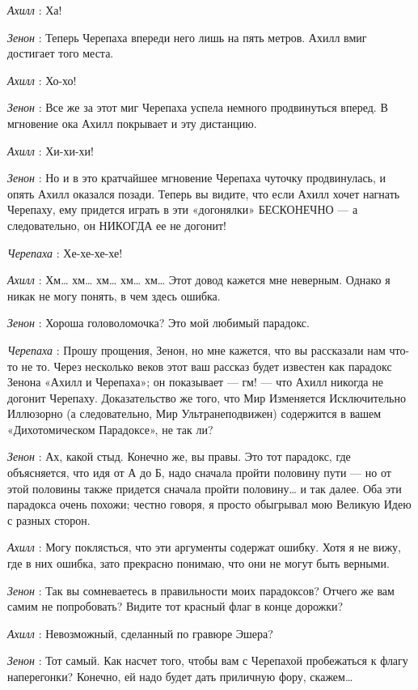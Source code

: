 \emph{Ахилл} : Ха!

\emph{Зенон} : Теперь Черепаха впереди него лишь на пять метров. Ахилл вмиг достигает того места.

\emph{Ахилл} : Хо-хо!

\emph{Зенон} : Все же за этот миг Черепаха успела немного продвинуться вперед. В мгновение ока Ахилл покрывает и эту дистанцию.

\emph{Ахилл} : Хи-хи-хи!

\emph{Зенон} : Но и в это кратчайшее мгновение Черепаха чуточку продвинулась, и опять Ахилл оказался позади. Теперь вы видите, что если Ахилл хочет нагнать Черепаху, ему придется играть в эти «догонялки» БЕСКОНЕЧНО --- а следовательно, он НИКОГДА ее не догонит!

\emph{Черепаха} : Хе-хе-хе-хе!

\emph{Ахилл} : Хм\ldots{} хм\ldots{} хм\ldots{} хм\ldots{} хм\ldots{} Этот довод кажется мне неверным. Однако я никак не могу понять, в чем здесь ошибка.

\emph{Зенон} : Хороша головоломочка? Это мой любимый парадокс.

\emph{Черепаха} : Прошу прощения, Зенон, но мне кажется, что вы рассказали нам что-то не то. Через несколько веков этот ваш рассказ будет известен как парадокс Зенона «Ахилл и Черепаха»; он показывает --- гм! --- что Ахилл никогда не догонит Черепаху. Доказательство же того, что Мир Изменяется Исключительно Иллюзорно (а следовательно, Мир Ультранеподвижен) содержится в вашем «Дихотомическом Парадоксе», не так ли?

\emph{Зенон} : Ах, какой стыд. Конечно же, вы правы. Это тот парадокс, где объясняется, что идя от А до Б, надо сначала пройти половину пути --- но от этой половины также придется сначала пройти половину\ldots{} и так далее. Оба эти парадокса очень похожи; честно говоря, я просто обыгрывал мою Великую Идею с разных сторон.

\emph{Ахилл} : Могу поклясться, что эти аргументы содержат ошибку. Хотя я не вижу, где в них ошибка, зато прекрасно понимаю, что они не могут быть верными.

\emph{Зенон} : Так вы сомневаетесь в правильности моих парадоксов? Отчего же вам самим не попробовать? Видите тот красный флаг в конце дорожки?

\emph{Ахилл} : Невозможный, сделанный по гравюре Эшера?

\emph{Зенон} : Тот самый. Как насчет того, чтобы вам с Черепахой пробежаться к флагу наперегонки? Конечно, ей надо будет дать приличную фору, скажем\ldots{}

